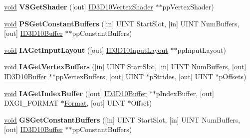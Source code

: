 \begin{DoxyCompactItemize}
\hyperlink{interfacevoid}{void} {\bfseries V\+S\+Get\+Shader} (\mbox{[}out\mbox{]} \hyperlink{interface_i_d3_d10_vertex_shader}{I\+D3\+D10\+Vertex\+Shader} $\ast$$\ast$pp\+Vertex\+Shader)
\item 
\mbox{\label{interface_i_d3_d10_device_a92b329283463b8b65644a3b0e418b080}} 
\hyperlink{interfacevoid}{void} {\bfseries P\+S\+Get\+Constant\+Buffers} (\mbox{[}in\mbox{]} U\+I\+NT Start\+Slot, \mbox{[}in\mbox{]} U\+I\+NT Num\+Buffers, \mbox{[}out\mbox{]} \hyperlink{interface_i_d3_d10_buffer}{I\+D3\+D10\+Buffer} $\ast$$\ast$pp\+Constant\+Buffers)
\item 
\mbox{\label{interface_i_d3_d10_device_a0ef9381bfff8801bf58845c712460a85}} 
\hyperlink{interfacevoid}{void} {\bfseries I\+A\+Get\+Input\+Layout} (\mbox{[}out\mbox{]} \hyperlink{interface_i_d3_d10_input_layout}{I\+D3\+D10\+Input\+Layout} $\ast$$\ast$pp\+Input\+Layout)
\item 
\mbox{\label{interface_i_d3_d10_device_ae9402e36a6ec2761991c6592f590fdf8}} 
\hyperlink{interfacevoid}{void} {\bfseries I\+A\+Get\+Vertex\+Buffers} (\mbox{[}in\mbox{]} U\+I\+NT Start\+Slot, \mbox{[}in\mbox{]} U\+I\+NT Num\+Buffers, \mbox{[}out\mbox{]} \hyperlink{interface_i_d3_d10_buffer}{I\+D3\+D10\+Buffer} $\ast$$\ast$pp\+Vertex\+Buffers, \mbox{[}out\mbox{]} U\+I\+NT $\ast$p\+Strides, \mbox{[}out\mbox{]} U\+I\+NT $\ast$p\+Offsets)
\item 
\mbox{\label{interface_i_d3_d10_device_ac44e1696ef12817248959658251839d7}} 
\hyperlink{interfacevoid}{void} {\bfseries I\+A\+Get\+Index\+Buffer} (\mbox{[}out\mbox{]} \hyperlink{interface_i_d3_d10_buffer}{I\+D3\+D10\+Buffer} $\ast$$\ast$p\+Index\+Buffer, \mbox{[}out\mbox{]} D\+X\+G\+I\+\_\+\+F\+O\+R\+M\+AT $\ast$\hyperlink{struct_format}{Format}, \mbox{[}out\mbox{]} U\+I\+NT $\ast$Offset)
\item 
\mbox{\label{interface_i_d3_d10_device_ae7298e6645980141edf1f19fe67157e8}} 
\hyperlink{interfacevoid}{void} {\bfseries G\+S\+Get\+Constant\+Buffers} (\mbox{[}in\mbox{]} U\+I\+NT Start\+Slot, \mbox{[}in\mbox{]} U\+I\+NT Num\+Buffers, \mbox{[}out\mbox{]} \hyperlink{interface_i_d3_d10_buffer}{I\+D3\+D10\+Buffer} $\ast$$\ast$pp\+Constant\+Buffers)
\item 

\end{DoxyCompactItemize}
